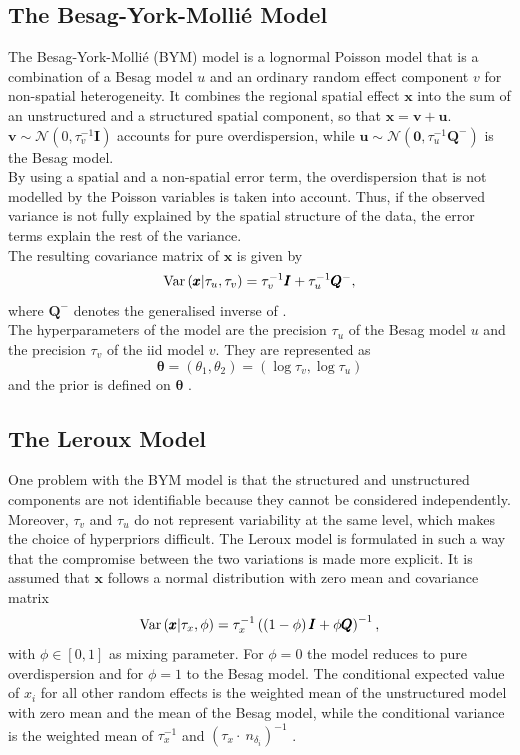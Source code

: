 \subsection{The Besag-York-Mollié Model}
The Besag-York-Mollié (BYM) model is a lognormal Poisson model that is a combination of a Besag model $u$ and an ordinary random effect component $v$ for non-spatial heterogeneity. It combines the regional spatial effect $\pmb{x}$ into the sum of an unstructured and a structured spatial component, so that $\pmb{x}=\pmb{v}+\pmb{u}$.\\
$\pmb{v}\sim\mathcal{N}\left(0,\tau_v^{-1}\pmb{I}\right)$ accounts for pure overdispersion, while $\pmb{u}\sim\mathcal{N}\left(\pmb{0}, \tau_u^{-1}\pmb{Q}^{-}\right)$ is the Besag model. \\
By using a spatial and a non-spatial error term, the overdispersion that is not modelled by the Poisson variables is taken into account. Thus, if the observed variance is not fully explained by the spatial structure of the data, the error terms explain the rest of the variance. \\
The resulting covariance matrix of $\pmb{x}$ is given by
\begin{equation}
    \hbox{Var}\left(\pmb{x}|\tau_u,\tau_v\right)=\tau_v^{-1}\pmb{I}+\tau_u^{-1}\pmb{Q}^{-},
\end{equation}
where $\pmb{Q}^{-}$ denotes the generalised inverse of . \\
The hyperparameters of the model are the precision $\tau_u$ of the Besag model $u$ and the precision $\tau_v$ of the iid model $v$. They are represented as
\begin{equation}
    \pmb{\theta}=\left(\theta_1, \theta_2\right)=\left(\log\tau_v,\log\tau_u\right)
\end{equation}
and the prior is defined on $\pmb{\theta}$ \autocite[][]{besag1991bayesian, riebler2016intuitive}.
\subsection{The Leroux Model}
One problem with the BYM model is that the structured and unstructured components are not identifiable because they cannot be considered independently. Moreover, $\tau_v$ and $\tau_u$ do not represent variability at the same level, which makes the choice of hyperpriors difficult. The Leroux model is formulated in such a way that the compromise between the two variations is made more explicit. It is assumed that $\pmb{x}$ follows a normal distribution with zero mean and covariance matrix
\begin{equation}
    \hbox{Var}\left(\pmb{x}|\tau_x,\phi\right)=\tau_x^{-1}\left(\left(1-\phi\right)\pmb{I}+\phi\pmb{Q}\right)^{-1},
\end{equation}
with $\phi\in\left[0,1\right]$ as mixing parameter. For $\phi=0$ the model reduces to pure overdispersion and for $\phi=1$ to the Besag model. The conditional expected value of $x_i$ for all other random effects is the weighted mean of the unstructured model with zero mean and the mean of the Besag model, while the conditional variance is the weighted mean of $\tau_x^{-1}$ and $\left(\tau_x\cdot\ n_{\delta_i}\right)^{-1}$ \autocite[][]{leroux2000estimation, riebler2016intuitive}.
